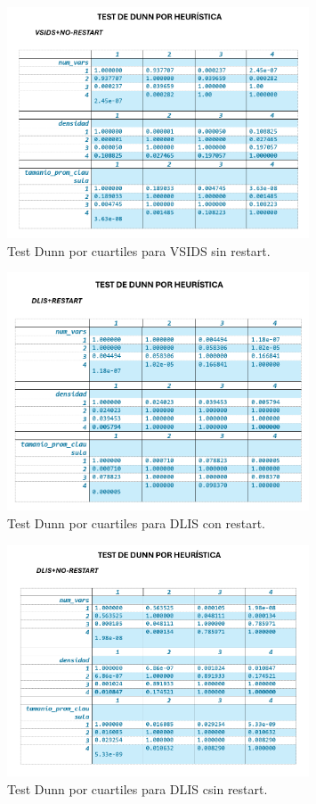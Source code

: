 \begin{figure}[ht]
    \centering
    \includegraphics[width=0.8\textwidth]{Graphics/test_dunn_vsids_no_restart.png}
    \caption{Test Dunn por cuartiles para VSIDS sin restart.}
    \label{fig:test-dunn-vsids-no-restart}
\end{figure}

\begin{figure}[ht]
    \centering
    \includegraphics[width=0.8\textwidth]{Graphics/test_dunn_dlis_restart.png}
    \caption{Test Dunn por cuartiles para DLIS con restart.}
    \label{fig:test-dunn-dlis-restart}
\end{figure}

\begin{figure}[ht]
    \centering
    \includegraphics[width=0.8\textwidth]{Graphics/test_dunn_dlis_no_restart.png}
    \caption{Test Dunn por cuartiles para DLIS csin restart.}
    \label{fig:test-dunn-dlis-no-restart}
\end{figure}

